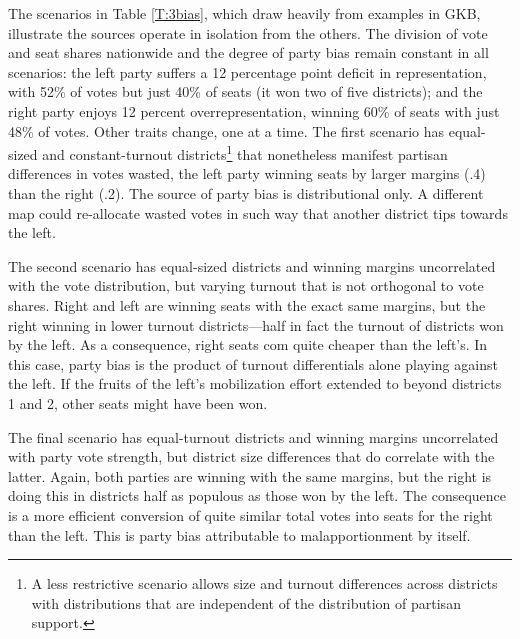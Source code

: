 \documentclass[letter,12pt]{article}
\begin{document}
The scenarios in Table \ref{T:3bias}, which draw heavily from examples in GKB, illustrate the sources operate in isolation from the others. The division of vote and seat shares nationwide and the degree of party bias remain constant in all scenarios: the left party suffers a 12 percentage point deficit in representation, with 52\% of votes but just 40\% of seats (it won two of five districts); and the right party enjoys 12 percent overrepresentation, winning 60\% of seats with just 48\% of votes. Other traits change, one at a time. The first scenario has equal-sized and constant-turnout districts\footnote{A less restrictive scenario allows size and turnout differences across districts with distributions that are independent of the distribution of partisan support.} that nonetheless manifest partisan differences in votes wasted, the left party winning seats by larger margins (.4) than the right (.2). The source of party bias is distributional only. A different map could re-allocate wasted votes in such way that another district tips towards the left. 

The second scenario has equal-sized districts and winning margins uncorrelated with the vote distribution, but varying turnout that is not orthogonal to vote shares. Right and left are winning seats with the exact same margins, but the right winning in lower turnout districts---half in fact the turnout of districts won by the left. As a consequence, right seats com quite cheaper than the left's. In this case, party bias is the product of turnout differentials alone playing against the left. If the fruits of the left's mobilization effort extended to beyond districts 1 and 2, other seats might have been won. 

The final scenario has equal-turnout districts and winning margins uncorrelated with party vote strength, but district size differences that do correlate with the latter. Again, both parties are winning with the same margins, but the right is doing this in districts half as populous as those won by the left. The consequence is a more efficient conversion of quite similar total votes into seats for the right than the left. This is party bias attributable to malapportionment by itself.  
\end{document}
